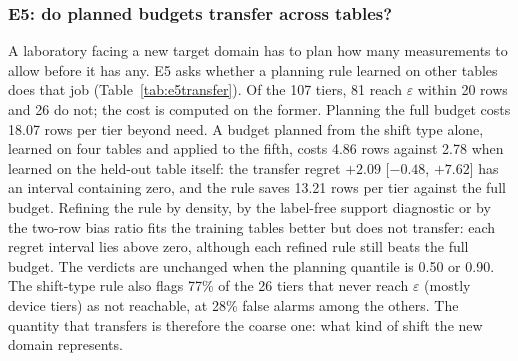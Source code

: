 \documentclass[11pt,a4paper]{article}
\begin{document}
\subsubsection{E5: do planned budgets transfer across tables?}
\label{sec:e5}
A laboratory facing a new target domain has to plan how many measurements to allow before it has
any. E5 asks whether a planning rule learned on other tables does that job
(Table~\ref{tab:e5transfer}). Of the 107 tiers, 81 reach $\varepsilon$ within 20 rows and
26 do not; the cost is computed on the former. Planning the full budget costs 18.07 rows per tier
beyond need. A budget planned from the shift type alone, learned on four tables and applied to the
fifth, costs 4.86 rows against 2.78 when learned on the held-out table itself: the transfer
regret $+2.09$ [$-0.48$, $+7.62$] has an interval containing zero, and the rule saves
13.21 rows per tier against the full budget. Refining the rule by density, by the label-free
support diagnostic or by the two-row bias ratio fits the training tables better but does not transfer:
each regret interval lies above zero, although each refined rule still beats the full budget. The
verdicts are unchanged when the planning quantile is 0.50 or 0.90. The shift-type rule also flags
77\% of the 26 tiers that never reach $\varepsilon$ (mostly device tiers) as not reachable, at
28\% false alarms among the others. The quantity that transfers is therefore the coarse one: what
kind of shift the new domain represents.

\begin{table}[htbp]
\centering\footnotesize
\caption{E5: planned budgets under five-fold table rotation. Cost = rows measured beyond the budget the
tier needed, or the full budget of 20 when the plan fell short (mean over the 81 tiers that reach
$\varepsilon$ within 20 rows). ``Transferred'' rules are learned on four tables and applied to the fifth;
``table-specific'' rules are learned on the held-out table itself. Regret = transferred $-$
table-specific; intervals are table-level block bootstraps.}
\label{tab:e5transfer}
\setlength{\tabcolsep}{3pt}
\end{table}
\end{document}

